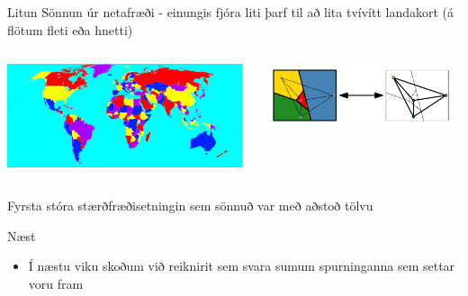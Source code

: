 \documentclass{beamer}
\begin{document}
\begin{frame}{Litun}
Sönnun úr netafræði - einungis fjóra liti þarf til að lita tvívítt landakort (á flötum fleti eða hnetti)
\begin{columns}
\begin{center}
\includegraphics[width=\linewidth]{Pics/world-map-four-colors}
\end{center}
\begin{center}
\includegraphics[width=\linewidth]{Pics/four-color}
\end{center}
\end{columns}
\vspace{0.5cm}
Fyrsta stóra stærðfræðisetningin sem sönnuð var með aðstoð tölvu
\end{frame}

\begin{frame}{Næst}
\begin{itemize}
 \item Í næstu viku skoðum við reiknirit sem svara sumum spurninganna sem settar voru fram
\end{itemize}

\end{frame}
\end{document}
